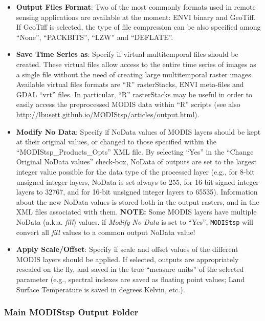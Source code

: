\documentclass[]{article}
\begin{document}
\begin{itemize}
\item
  \textbf{Output Files Format}: Two of the most commonly formats used in
  remote sensing applications are available at the moment: ENVI binary
  and GeoTiff. If GeoTiff is selected, the type of file compression can
  be also specified among ``None'', ``PACKBITS'', ``LZW'' and
  ``DEFLATE''.
\item
  \textbf{Save Time Series as}: Specify if virtual multitemporal files
  should be created. These virtual files allow access to the entire time
  series of images as a single file without the need of creating large
  multitemporal raster images. Available virtual files formats are ``R''
  rasterStacks, ENVI meta-files and GDAL ``vrt'' files. In particular,
  ``R'' rasterStacks may be useful in order to easily access the
  preprocessed MODIS data within ``R'' scripts (see also
  \url{http://lbusett.github.io/MODIStsp/articles/output.html}).
\item
  \textbf{Modify No Data}: Specify if NoData values of MODIS layers
  should be kept at their original values, or changed to those specified
  within the ``MODIStsp\_Products\_Opts'' XML file. By selecting ``Yes''
  in the ``Change Original NoData values'' check-box, NoData of outputs
  are set to the largest integer value possible for the data type of the
  processed layer (e.g., for 8-bit unsigned integer layers, NoData is
  set always to 255, for 16-bit signed integer layers to 32767, and for
  16-bit unsigned integer layers to 65535). Information about the new
  NoData values is stored both in the output rasters, and in the XML
  files associated with them. \textbf{NOTE:} Some MODIS layers have
  multiple NoData (a.k.a. \emph{fill}) values. if \emph{Modify No Data}
  is set to ``Yes'', \texttt{MODIStsp} will convert all \emph{fill}
  values to a common output NoData value!
\item
  \textbf{Apply Scale/Offset}: Specify if scale and offset values of the
  different MODIS layers should be applied. If selected, outputs are
  appropriately rescaled on the fly, and saved in the true ``measure
  units'' of the selected parameter (e.g., spectral indexes are saved as
  floating point values; Land Surface Temperature is saved in degrees
  Kelvin, etc.).
\end{itemize}

\subsubsection{\texorpdfstring{\textbf{Main MODIStsp Output
Folder}}{Main MODIStsp Output Folder}}\label{main-modistsp-output-folder}
\end{document}
